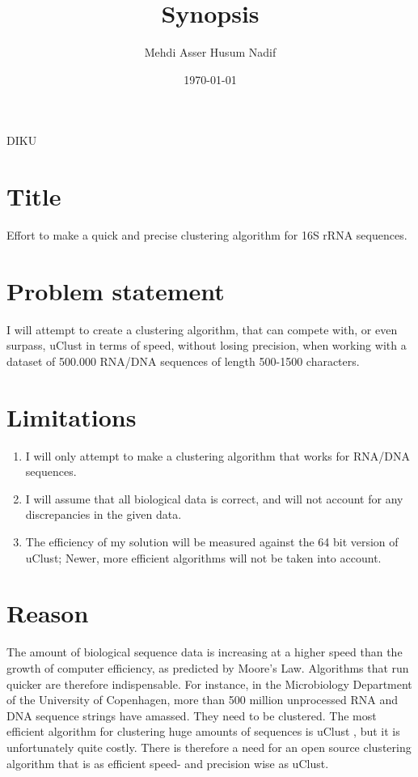 \documentclass[10pt,a4paper]{article} %
\begin{document}
\title{\textbf{Synopsis}}
\author{Mehdi Asser Husum Nadif}
\date{\today}
\maketitle

\null
\vfill
\begin{center}
DIKU
\end{center}
\clearpage %
\section*{Title}
Effort to make a quick and precise clustering algorithm for 16S rRNA sequences.
\section*{Problem statement}
I will attempt to create a clustering algorithm, that can compete with, or even surpass, uClust in terms of speed, without losing precision, when working with a dataset of 500.000 RNA/DNA sequences of length 500-1500 characters.

\section*{Limitations}
\begin{enumerate}
\item I will only attempt to make a clustering algorithm that works for RNA/DNA sequences. 
\item I will assume that all biological data is correct, and will not account for any discrepancies in the given data.
\item The efficiency of my solution will be measured against the 64 bit version of uClust; Newer, more efficient algorithms will not be taken into account.
\end{enumerate}

\section*{Reason}

The amount of biological sequence data is increasing at a higher speed than the growth of computer efficiency, as predicted by Moore's Law. Algorithms that run quicker are therefore indispensable. For instance, in the Microbiology Department of the University of Copenhagen, more than 500 million unprocessed RNA and DNA sequence strings have amassed. They need to be clustered. The most efficient algorithm for clustering huge amounts of sequences is uClust \cite{Wei et al}, but it is unfortunately quite costly. 
There is therefore a need for an open source clustering algorithm that is as efficient speed- and precision wise as uClust. 
\end{document}
